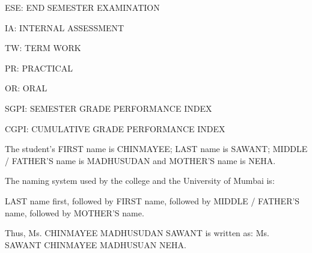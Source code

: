 \documentclass{article} %
\begin{document}
\noindent 

\noindent ESE: END SEMESTER EXAMINATION   

\noindent IA: INTERNAL ASSESSMENT

\noindent TW: TERM WORK

\noindent PR: PRACTICAL

\noindent OR: ORAL

\noindent SGPI: SEMESTER GRADE PERFORMANCE INDEX

\noindent CGPI: CUMULATIVE GRADE PERFORMANCE INDEX

\noindent 

\noindent {} The student's FIRST name is CHINMAYEE; LAST name is SAWANT; MIDDLE / FATHER'S name is MADHUSUDAN and MOTHER'S name is NEHA.

\noindent The naming system used by the college and the University of Mumbai is:

\noindent LAST name first, followed by FIRST name, followed by MIDDLE / FATHER'S name, followed by MOTHER'S name.

\noindent 

\noindent Thus, Ms. CHINMAYEE MADHUSUDAN SAWANT is written as: Ms. SAWANT CHINMAYEE MADHUSUAN NEHA. 

\noindent 

\noindent 

\noindent 

\noindent 

\noindent 

\noindent 

\noindent 

\noindent 

\noindent 

\noindent 

\noindent 

\noindent 

\noindent 

\noindent 

\noindent 

\noindent 

\noindent 

\noindent 

\noindent 

\noindent 

\noindent 

\noindent 

\noindent 

\noindent 

\noindent 

\noindent 
\end{document}
